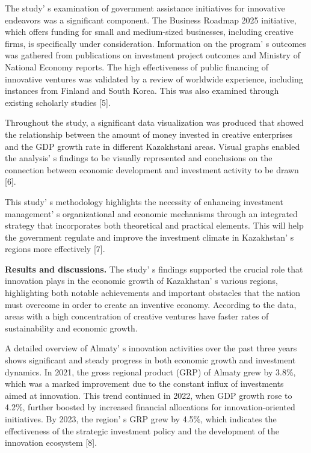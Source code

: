 The study' s examination of government assistance
initiatives for innovative endeavors was a significant component. The
Business Roadmap 2025 initiative, which offers funding for small and
medium-sized businesses, including creative firms, is specifically under
consideration. Information on the program' s outcomes was
gathered from publications on investment project outcomes and Ministry
of National Economy reports. The high effectiveness of public financing
of innovative ventures was validated by a review of worldwide
experience, including instances from Finland and South Korea. This was
also examined through existing scholarly studies {[}5{]}.

Throughout the study, a significant data visualization was produced that
showed the relationship between the amount of money invested in creative
enterprises and the GDP growth rate in different Kazakhstani areas.
Visual graphs enabled the analysis' s findings to be
visually represented and conclusions on the connection between economic
development and investment activity to be drawn {[}6{]}.

This study' s methodology highlights the necessity of
enhancing investment management' s organizational and
economic mechanisms through an integrated strategy that incorporates
both theoretical and practical elements. This will help the government
regulate and improve the investment climate in
Kazakhstan' s regions more effectively {[}7{]}.

{\bfseries Results and discussions.} The study' s findings
supported the crucial role that innovation plays in the economic growth
of Kazakhstan' s various regions, highlighting both
notable achievements and important obstacles that the nation must
overcome in order to create an inventive economy. According to the data,
areas with a high concentration of creative ventures have faster rates
of sustainability and economic growth.

A detailed overview of Almaty' s innovation activities
over the past three years shows significant and steady progress in both
economic growth and investment dynamics. In 2021, the gross regional
product (GRP) of Almaty grew by 3.8\%, which was a marked improvement
due to the constant influx of investments aimed at innovation. This
trend continued in 2022, when GDP growth rose to 4.2\%, further boosted
by increased financial allocations for innovation-oriented initiatives.
By 2023, the region' s GRP grew by 4.5\%, which indicates
the effectiveness of the strategic investment policy and the development
of the innovation ecosystem {[}8{]}.

